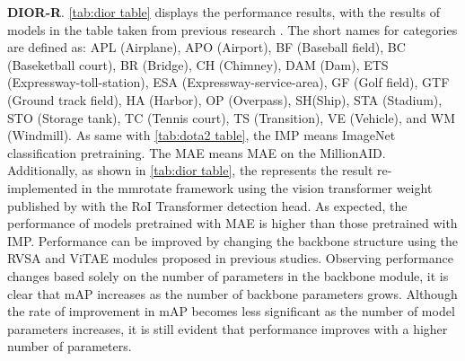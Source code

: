 \textbf{DIOR-R}. \autoref{tab:dior table} displays the performance results, with the results of models in the table taken from previous research \cite{wang2022advancing}. {The short names for categories are defined as: APL (Airplane), APO (Airport), BF (Baseball field), BC (Baseketball court), BR (Bridge), CH (Chimney), DAM (Dam), ETS (Expressway-toll-station), ESA (Expressway-service-area), GF (Golf field), GTF (Ground track field), HA (Harbor), OP (Overpass), SH(Ship), STA (Stadium), STO (Storage tank), TC (Tennis court), TS (Transition), VE (Vehicle), and WM (Windmill). As same with \autoref{tab:dota2 table}, the IMP means ImageNet classification pretraining. The MAE means MAE on the MillionAID.} Additionally, as shown in \autoref{tab:dior table}, the  represents the result re-implemented in the mmrotate framework using the vision transformer weight published by \cite{wang2022advancing} with the RoI Transformer detection head. As expected, the performance of models pretrained with MAE is higher than those pretrained with IMP. Performance can be improved by changing the backbone structure using the RVSA \cite{wang2022advancing} and ViTAE \cite{xu2021vitae} modules proposed in previous studies. Observing performance changes based solely on the number of parameters in the backbone module, it is clear that mAP increases as the number of backbone parameters grows. Although the rate of improvement in mAP becomes less significant as the number of model parameters increases, it is still evident that performance improves with a higher number of parameters.

